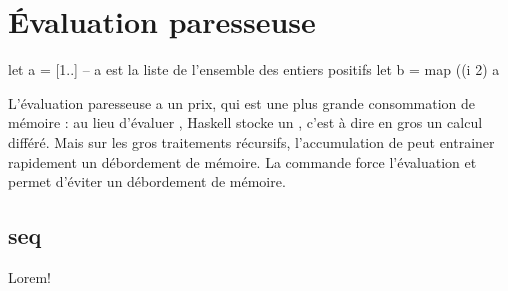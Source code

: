 \section{Évaluation paresseuse}
\label{sec:lazyness}

\begin{haskellcode}
let a = [1..] -- a est la liste de l'ensemble des entiers positifs
let b = map ((^^) 2) a
\end{haskellcode}

L'évaluation paresseuse a un prix, qui est une plus grande consommation de
mémoire : au lieu d'évaluer , Haskell stocke un , c'est
à dire en gros un calcul différé. Mais sur les gros traitements récursifs,
l'accumulation de  peut entrainer rapidement un
débordement de mémoire. La commande  force l'évaluation et permet
d'éviter un débordement de mémoire.

\subsection[]{seq}

Lorem!
